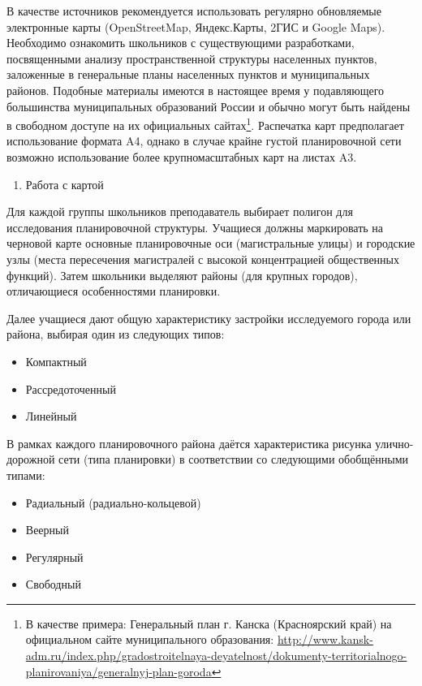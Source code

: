 \documentclass[
  11pt,
]{book}
\providecommand{\tightlist}{%
  \setlength{\itemsep}{0pt}\setlength{\parskip}{0pt}}
\begin{document}
В качестве источников рекомендуется использовать регулярно обновляемые
электронные карты (OpenStreetMap, Яндекс.Карты, 2ГИС и Google Maps). Необходимо ознакомить школьников с существующими разработками, посвященными анализу пространственной структуры населенных пунктов, заложенные в генеральные планы населенных пунктов и муниципальных
районов. Подобные материалы имеются в настоящее время у подавляющего
большинства муниципальных образований России и обычно могут быть найдены в
свободном доступе на их официальных сайтах\footnote{В качестве примера: Генеральный план г. Канска (Красноярский край) на официальном сайте муниципального образования:
  \url{http://www.kansk-adm.ru/index.php/gradostroitelnaya-deyatelnost/dokumenty-territorialnogo-planirovaniya/generalnyj-plan-goroda}}. Распечатка карт предполагает использование формата A4, однако в случае крайне густой планировочной сети возможно использование более крупномасштабных карт на листах A3.

\begin{enumerate}
\def\labelenumi{\arabic{enumi}.}
\setcounter{enumi}{1}
\tightlist
\item
  Работа с картой
\end{enumerate}

Для каждой группы школьников преподаватель выбирает полигон для исследования планировочной структуры. Учащиеся должны маркировать на черновой карте основные планировочные оси (магистральные улицы) и городские узлы (места пересечения магистралей с высокой концентрацией общественных функций). Затем школьники выделяют районы (для крупных городов), отличающиеся особенностями планировки.

Далее учащиеся дают общую характеристику застройки исследуемого города или района, выбирая один из следующих типов:

\begin{itemize}
\item
  Компактный
\item
  Рассредоточенный
\item
  Линейный
\end{itemize}

В рамках каждого планировочного района даётся характеристика рисунка
улично-дорожной сети (типа планировки) в соответствии со следующими обобщёнными типами:

\begin{itemize}
\item
  Радиальный (радиально-кольцевой)
\item
  Веерный
\item
  Регулярный
\item
  Свободный
\end{itemize}
\end{document}
